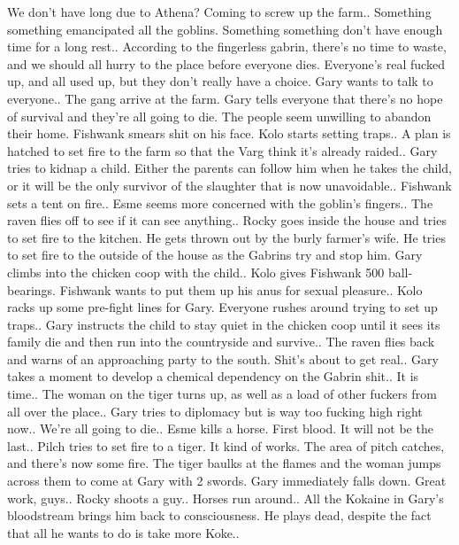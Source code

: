 We don’t have long due to Athena? Coming to screw up the farm..\medskip
Something something emancipated all the goblins. Something something don’t have enough time for a long rest..\medskip
According to the fingerless gabrin, there’s no time to waste, and we should all hurry to the place before everyone dies. Everyone’s real fucked up, and all used up, but they don’t really have a choice. Gary wants to talk to everyone..\medskip
The gang arrive at the farm. Gary tells everyone that there’s no hope of survival and they’re all going to die. The people seem unwilling to abandon their home. Fishwank smears shit on his face. Kolo starts setting traps..\medskip
A plan is hatched to set fire to the farm so that the Varg think it’s already raided..\medskip
Gary tries to kidnap a child. Either the parents can follow him when he takes the child, or it will be the only survivor of the slaughter that is now unavoidable..\medskip
Fishwank sets a tent on fire..\medskip
Esme seems more concerned with the goblin’s fingers..\medskip
The raven flies off to see if it can see anything..\medskip
Rocky goes inside the house and tries to set fire to the kitchen. He gets thrown out by the burly farmer’s wife. He tries to set fire to the outside of the house as the Gabrins try and stop him. Gary climbs into the chicken coop with the child..\medskip
Kolo gives Fishwank 500 ball-bearings. Fishwank wants to put them up his anus for sexual pleasure..\medskip
Kolo racks up some pre-fight lines for Gary. Everyone rushes around trying to set up traps..\medskip
Gary instructs the child to stay quiet in the chicken coop until it sees its family die and then run into the countryside and survive..\medskip
The raven flies back and warns of an approaching party to the south. Shit’s about to get real..\medskip
Gary takes a moment to develop a chemical dependency on the Gabrin shit..\medskip
It is time..\medskip
The woman on the tiger turns up, as well as a load of other fuckers from all over the place..\medskip
Gary tries to diplomacy but is way too fucking high right now..\medskip
We’re all going to die..\medskip
Esme kills a horse. First blood. It will not be the last..\medskip
Pilch tries to set fire to a tiger. It kind of works. The area of pitch catches, and there’s now some fire. The tiger baulks at the flames and the woman jumps across them to come at Gary with 2 swords. Gary immediately falls down. Great work, guys..\medskip
Rocky shoots a guy..\medskip
Horses run around..\medskip
All the Kokaine in Gary’s bloodstream brings him back to consciousness. He plays dead, despite the fact that all he wants to do is take more Koke..\medskip
